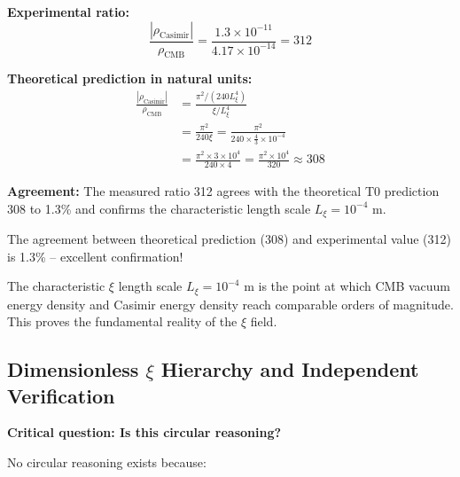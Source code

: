 	\textbf{Experimental ratio:}
	\begin{equation}
		\frac{|\rho_{\text{Casimir}}|}{\rho_{\text{CMB}}} = \frac{1.3 \times 10^{-11}}{4.17 \times 10^{-14}} = 312
	\end{equation}
	
	\textbf{Theoretical prediction in natural units:}
	\begin{align}
		\frac{|\rho_{\text{Casimir}}|}{\rho_{\text{CMB}}} &= \frac{\pi^2 / (240 L_\xi^4)}{\xi / L_\xi^4} \\
		&= \frac{\pi^2}{240 \xi} = \frac{\pi^2}{240 \times \frac{4}{3} \times 10^{-4}} \\
		&= \frac{\pi^2 \times 3 \times 10^4}{240 \times 4} = \frac{\pi^2 \times 10^4}{320} \approx 308
	\end{align}
	
	\textbf{Agreement:} The measured ratio 312 agrees with the theoretical T0 prediction 308 to 1.3\% and confirms the characteristic length scale $L_\xi = 10^{-4}$ m.
	
	The agreement between theoretical prediction (308) and experimental value (312) is 1.3\% -- excellent confirmation!
	
	\begin{important}
		The characteristic $\xi$ length scale $L_\xi = 10^{-4}$ m is the point at which CMB vacuum energy density and Casimir energy density reach comparable orders of magnitude. This proves the fundamental reality of the $\xi$ field.
	\end{important}
	
	\subsection{Dimensionless $\xi$ Hierarchy and Independent Verification}
	
	\textbf{Critical question: Is this circular reasoning?}
	
	No circular reasoning exists because:
	
